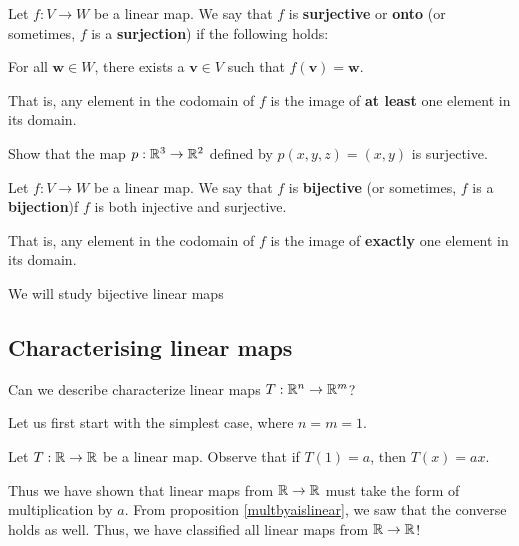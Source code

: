 \begin{definition}
    Let $f: V \to W$ be a linear map.  We say that $f$ is \textbf{surjective} or \textbf{onto}  (or sometimes, $f$ is a \textbf{surjection}) if the following holds:
    
    \begin{center}
        
    For all $\bm{w} \in W$, there exists a $\bm{v} \in V$ such that $f(\bm{v}) = \bm{w}$.
    \end{center}
    
    That is, any element in the codomain of $f$ is the image of \textbf{at least} one element in its domain.  
\end{definition}

\begin{example}
Show that the map $p: \mathbb{R}^3 \to \mathbb{R}^2$ defined by $p(x,y,z) = (x,y)$ is surjective.
\end{example}

\begin{definition}\label{bijective}
    Let $f: V \to W$ be a linear map.  We say that $f$ is \textbf{bijective}  (or sometimes, $f$ is a \textbf{bijection})f $f$ is both injective and surjective.
    
    That is, any element in the codomain of $f$ is the image of \textbf{exactly} one element in its domain.  
\end{definition}

We will study bijective linear maps 




\subsection{Characterising linear maps}

\begin{motivating}
Can we describe characterize linear maps $T: \mathbb{R}^n \to \mathbb{R}^m$?
\end{motivating}

Let us first start with the simplest case, where $n = m = 1$.

\begin{proposition}\label{proplinear1d}
    Let $T: \mathbb{R} \to \mathbb{R}$ be a linear map. Observe that if $T(1) = a$, then $T(x) = ax$.
\end{proposition}

Thus we have shown that linear maps from $\mathbb{R} \to \mathbb{R}$ must take the form of multiplication by $a$. From proposition \ref{multbyaislinear}, we saw that the converse holds as well.  Thus, we have classified all linear maps from $\mathbb{R} \to \mathbb{R}$!

